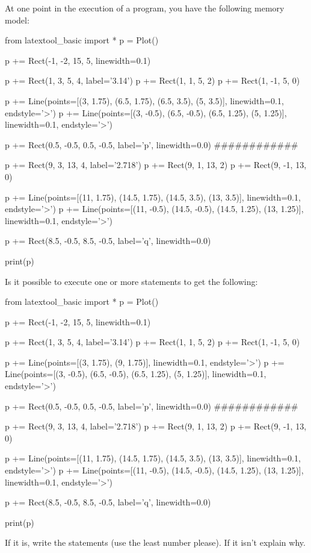 \begin{ex}
At one point in the execution of a program, you have the following memory model:
\begin{python}
from latextool_basic import *
p = Plot()

p += Rect(-1, -2, 15, 5, linewidth=0.1)

p += Rect(1, 3, 5, 4, label='3.14')
p += Rect(1, 1, 5, 2)
p += Rect(1, -1, 5, 0)

p += Line(points=[(3, 1.75), (6.5, 1.75), (6.5, 3.5), (5, 3.5)],
          linewidth=0.1, endstyle='>')
p += Line(points=[(3, -0.5), (6.5, -0.5), (6.5, 1.25), (5, 1.25)],
          linewidth=0.1, endstyle='>')

p += Rect(0.5, -0.5, 0.5, -0.5, label='p', linewidth=0.0)
############

p += Rect(9, 3, 13, 4, label='2.718')
p += Rect(9, 1, 13, 2)
p += Rect(9, -1, 13, 0)

p += Line(points=[(11, 1.75), (14.5, 1.75), (14.5, 3.5), (13, 3.5)],
          linewidth=0.1, endstyle='>')
p += Line(points=[(11, -0.5), (14.5, -0.5), (14.5, 1.25), (13, 1.25)],
          linewidth=0.1, endstyle='>')

p += Rect(8.5, -0.5, 8.5, -0.5, label='q', linewidth=0.0)

print(p)
\end{python}

Is it possible to execute one or more statements to get the following:
\begin{python}
from latextool_basic import *
p = Plot()

p += Rect(-1, -2, 15, 5, linewidth=0.1)

p += Rect(1, 3, 5, 4, label='3.14')
p += Rect(1, 1, 5, 2)
p += Rect(1, -1, 5, 0)

p += Line(points=[(3, 1.75), (9, 1.75)],
          linewidth=0.1, endstyle='>')
p += Line(points=[(3, -0.5), (6.5, -0.5), (6.5, 1.25), (5, 1.25)],
          linewidth=0.1, endstyle='>')

p += Rect(0.5, -0.5, 0.5, -0.5, label='p', linewidth=0.0)
############

p += Rect(9, 3, 13, 4, label='2.718')
p += Rect(9, 1, 13, 2)
p += Rect(9, -1, 13, 0)

p += Line(points=[(11, 1.75), (14.5, 1.75), (14.5, 3.5), (13, 3.5)],
          linewidth=0.1, endstyle='>')
p += Line(points=[(11, -0.5), (14.5, -0.5), (14.5, 1.25), (13, 1.25)],
          linewidth=0.1, endstyle='>')

p += Rect(8.5, -0.5, 8.5, -0.5, label='q', linewidth=0.0)

print(p)
\end{python}

If it is, write the statements (use the least number please). If it isn't explain why.
\end{ex}

